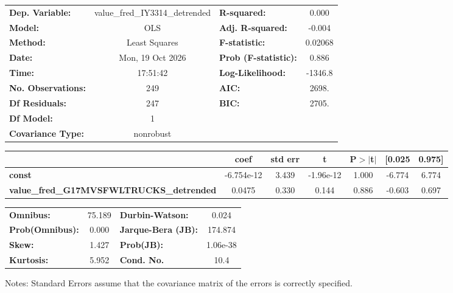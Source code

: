 \begin{center}
\begin{tabular}{lclc}
\toprule
\textbf{Dep. Variable:}                          & value\_fred\_IY3314\_detrended & \textbf{  R-squared:         } &     0.000   \\
\textbf{Model:}                                  &              OLS               & \textbf{  Adj. R-squared:    } &    -0.004   \\
\textbf{Method:}                                 &         Least Squares          & \textbf{  F-statistic:       } &   0.02068   \\
\textbf{Date:}                                   &        Mon, 19 Oct 2026        & \textbf{  Prob (F-statistic):} &    0.886    \\
\textbf{Time:}                                   &            17:51:42            & \textbf{  Log-Likelihood:    } &   -1346.8   \\
\textbf{No. Observations:}                       &                249             & \textbf{  AIC:               } &     2698.   \\
\textbf{Df Residuals:}                           &                247             & \textbf{  BIC:               } &     2705.   \\
\textbf{Df Model:}                               &                  1             & \textbf{                     } &             \\
\textbf{Covariance Type:}                        &           nonrobust            & \textbf{                     } &             \\
\bottomrule
\end{tabular}
\begin{tabular}{lcccccc}
                                                 & \textbf{coef} & \textbf{std err} & \textbf{t} & \textbf{P$> |$t$|$} & \textbf{[0.025} & \textbf{0.975]}  \\
\midrule
\textbf{const}                                   &   -6.754e-12  &        3.439     & -1.96e-12  &         1.000        &       -6.774    &        6.774     \\
\textbf{value\_fred\_G17MVSFWLTRUCKS\_detrended} &       0.0475  &        0.330     &     0.144  &         0.886        &       -0.603    &        0.697     \\
\bottomrule
\end{tabular}
\begin{tabular}{lclc}
\textbf{Omnibus:}       & 75.189 & \textbf{  Durbin-Watson:     } &    0.024  \\
\textbf{Prob(Omnibus):} &  0.000 & \textbf{  Jarque-Bera (JB):  } &  174.874  \\
\textbf{Skew:}          &  1.427 & \textbf{  Prob(JB):          } & 1.06e-38  \\
\textbf{Kurtosis:}      &  5.952 & \textbf{  Cond. No.          } &     10.4  \\
\bottomrule
\end{tabular}
\end{center}

Notes: \newline
 [1] Standard Errors assume that the covariance matrix of the errors is correctly specified.